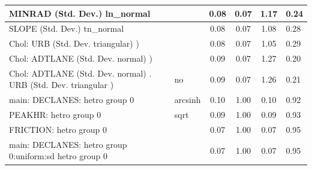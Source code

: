 \begin{table}
\begin{center}
\begin{tabular}{|l|l|c|c|c|l|}
			\hline
			MINRAD (Std. Dev.) ln_normal &  & 0.08 & 0.07 & 1.17 & 0.24 \\
			\hline
			SLOPE (Std. Dev.) tn_normal &  & 0.08 & 0.07 & 1.08 & 0.28 \\
			\hline
			 Chol: URB (Std. Dev. triangular) ) &  & 0.08 & 0.07 & 1.05 & 0.29 \\
			\hline
			 Chol: ADTLANE (Std. Dev. normal) ) &  & 0.09 & 0.07 & 1.27 & 0.20 \\
			\hline
			 Chol: ADTLANE (Std. Dev. normal) . URB (Std. Dev.   triangular ) & no & 0.09 & 0.07 & 1.26 & 0.21 \\
			\hline
			main: DECLANES: hetro group 0 & arcsinh & 0.10 & 1.00 & 0.10 & 0.92 \\
			\hline
			PEAKHR: hetro group 0 & sqrt & 0.09 & 1.00 & 0.09 & 0.93 \\
			\hline
			FRICTION: hetro group 0 &  & 0.07 & 1.00 & 0.07 & 0.95 \\
			\hline
			main: DECLANES: hetro group 0:uniform:sd  hetro group 0 &  & 0.07 & 1.00 & 0.07 & 0.95 \\
			\hline
		\end{tabular}
	\end{center}
\end{table}